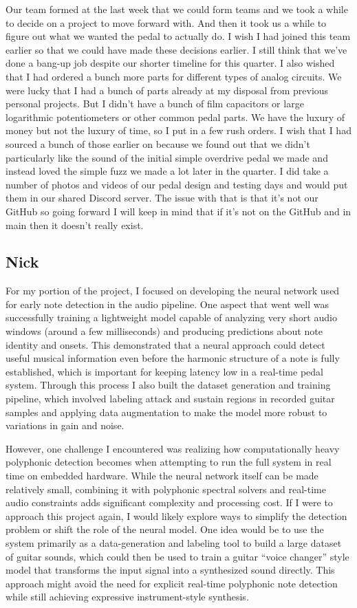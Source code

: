 \documentclass[12pt]{article}
\begin{document}
Our team formed at the last week that we could form teams and we took a while to decide on a project to move forward with. And then it took us a while to figure out what we wanted the pedal to actually do. I wish I had joined this team earlier so that we could have made these decisions earlier. I still think that we've done a bang-up job despite our shorter timeline for this quarter. I also wished that I had ordered a bunch more parts for different types of analog circuits. We were lucky that I had a bunch of parts already at my disposal from previous personal projects. But I didn't have a bunch of film capacitors or large logarithmic potentiometers or other common pedal parts. We have the luxury of money but not the luxury of time, so I put in a few rush orders. I wish that I had sourced a bunch of those earlier on because we found out that we didn't particularly like the sound of the initial simple overdrive pedal we made and instead loved the simple fuzz we made a lot later in the quarter. I did take a number of photos and videos of our pedal design and testing days and would put them in our shared Discord server. The issue with that is that it's not our GitHub so going forward I will keep in mind that if it's not on the GitHub and in main then it doesn't really exist.

\subsection*{Nick}
For my portion of the project, I focused on developing the neural network used for early note detection in the audio pipeline. One aspect that went well was successfully training a lightweight model capable of analyzing very short audio windows (around a few milliseconds) and producing predictions about note identity and onsets. This demonstrated that a neural approach could detect useful musical information even before the harmonic structure of a note is fully established, which is important for keeping latency low in a real-time pedal system. Through this process I also built the dataset generation and training pipeline, which involved labeling attack and sustain regions in recorded guitar samples and applying data augmentation to make the model more robust to variations in gain and noise.

However, one challenge I encountered was realizing how computationally heavy polyphonic detection becomes when attempting to run the full system in real time on embedded hardware. While the neural network itself can be made relatively small, combining it with polyphonic spectral solvers and real-time audio constraints adds significant complexity and processing cost. If I were to approach this project again, I would likely explore ways to simplify the detection problem or shift the role of the neural model. One idea would be to use the system primarily as a data-generation and labeling tool to build a large dataset of guitar sounds, which could then be used to train a guitar “voice changer” style model that transforms the input signal into a synthesized sound directly. This approach might avoid the need for explicit real-time polyphonic note detection while still achieving expressive instrument-style synthesis.
\end{document}
